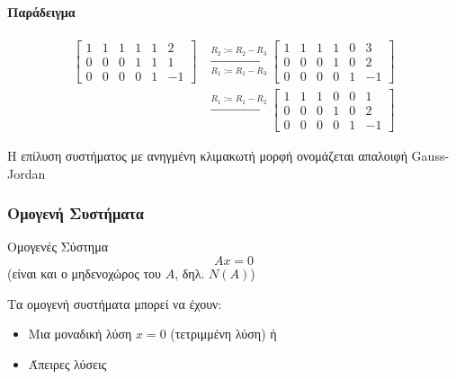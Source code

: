 \documentclass[11pt,a4paper,notitlepage,fleqn,final]{article}
\begin{document}
\begin{itemize}
	\paragraph{Παράδειγμα}
	\begin{align*}
		\left[\begin{array}{ccccc|c}
		1&1&1&1&1&2\\0&0&0&1&1&1\\0&0&0&0&1&-1
		\end{array}\right] &\xrightarrow[R_1:=R_1-R_3]{R_2:=R_2-R_3}
		\left[\begin{array}{ccccc|c}
		1&1&1&1&0&3\\0&0&0&1&0&2\\0&0&0&0&1&-1
		\end{array}\right] \\&\xrightarrow{R_1:=R_1-R_2}
		\left[\begin{array}{ccccc|c}
		1&1&1&0&0&1\\0&0&0&1&0&2\\0&0&0&0&1&-1
		\end{array}\right]
	\end{align*}

	Η επίλυση συστήματος με ανηγμένη κλιμακωτή μορφή ονομάζεται
	απαλοιφή Gauss-Jordan

	\subsubsection{Ομογενή Συστήματα}
	\begin{defn}{Ομογενές Σύστημα}{}
		\[
		Ax = 0
		\]
		(είναι και ο μηδενοχώρος του \( A \), δηλ. \( N(A) \))
	\end{defn}
	Τα ομογενή συστήματα μπορεί να έχουν:
	\begin{itemize}
		\item Μια μοναδική λύση \( x=0 \) (τετριμμένη λύση) ή
		\item Άπειρες λύσεις
	\end{itemize}


\end{itemize}
\end{document}

